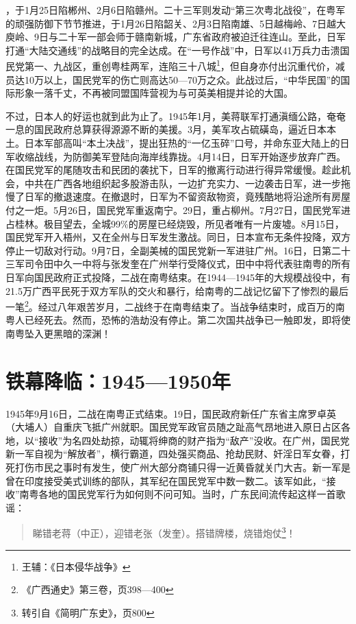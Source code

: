 ，于1月25日陷郴州、2月6日陷赣州。二十三军则发动“第三次粤北战役”，在粤军的顽强防御下节节推进，于1月26日陷韶关、2月3日陷南雄、5日越梅岭、7日越大庾岭、9日与二十军一部会师于赣南新城，广东省政府被迫迁往连山。至此，日军打通“大陆交通线”的战略目的完全达成。在“一号作战”中，日军以41万兵力击溃国民党第一、九战区，重创粤桂两军，连陷三十八城\footnote{王辅：《日本侵华战争》}，但自身亦付出沉重代价，减员达10万以上，国民党军的伤亡则高达50—70万之众。此战过后，“中华民国”的国际形象一落千丈，不再被同盟国阵营视为与可英美相提并论的大国。

不过，日本人的好运也就到此为止了。1945年1月，美蒋联军打通滇缅公路，奄奄一息的国民政府总算获得源源不断的美援。3月，美军攻占硫磺岛，逼近日本本土。日本军部高叫“本土决战”，提出狂热的“一亿玉碎”口号，并命东亚大陆上的日军收缩战线，为防御美军登陆向海岸线靠拢。4月14日，日军开始逐步放弃广西。在国民党军的尾随攻击和民团的袭扰下，日军的撤离行动进行得异常缓慢。趁此机会，中共在广西各地组织起多股游击队，一边扩充实力、一边袭击日军，进一步拖慢了日军的撤退速度。在撤退时，日军为不留资敌物资，竟残酷地将沿途所有房屋付之一炬。5月26日，国民党军重返南宁。29日，重占柳州。7月27日，国民党军进占桂林。极目望去，全城99\%的房屋已经烧毁，所见者唯有一片废墟。8月15日，国民党军开入梧州，又在全州与日军发生激战。同日，日本宣布无条件投降，双方停止一切敌对行动。9月7日，全副美械的国民党新一军进驻广州。16日，日第二十三军司令田中久一中将与张发奎在广州举行受降仪式，田中中将代表驻南粤的所有日军向国民政府正式投降，二战在南粤结束。在1944—1945年的大规模战役中，有21.5万广西平民死于双方军队的交火和暴行，给南粤的二战记忆留下了惨烈的最后一笔\footnote{《广西通史》第三卷，页398—400}。经过八年艰苦岁月，二战终于在南粤结束了。当战争结束时，成百万的南粤人已经死去。然而，恐怖的浩劫没有停止。第二次国共战争已一触即发，即将使南粤坠入更黑暗的深渊！

\section{铁幕降临：1945—1950年}

1945年9月16日，二战在南粤正式结束。19日，国民政府新任广东省主席罗卓英（大埔人）自重庆飞抵广州就职。国民党军政官员随之趾高气昂地进入原日占区各地，以“接收”为名四处劫掠，动辄将绅商的财产指为“敌产”没收。在广州，国民党新一军自视为“解放者”，横行霸道，四处强买商品、抢劫民财、奸淫日军女眷，打死打伤市民之事时有发生，使广州大部分商铺只得一近黄昏就关门大吉。新一军是曾在印度接受美式训练的部队，其军纪在国民党军中数一数二。该军如此，“接收”南粤各地的国民党军行为如何则不问可知。当时，广东民间流传起这样一首歌谣：

\begin{quote}

睇错老蒋（中正），迎错老张（发奎）。搭错牌楼，烧错炮仗\footnote{转引自《简明广东史》，页800}！

\end{quote}

